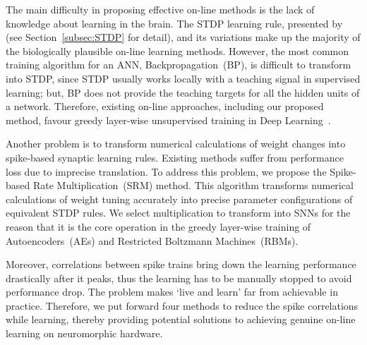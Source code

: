 
The main difficulty in proposing effective on-line methods is the lack of knowledge about learning in the brain.
The STDP learning rule, presented by~\citet{bi1998synaptic} (see Section~\ref{subsec:STDP} for detail), and its variations make up the majority of the biologically plausible on-line learning methods.
However, the most common training algorithm for an ANN, Backpropagation~(BP), is difficult to transform into STDP, since STDP usually works locally with a teaching signal in supervised learning; but, BP does not provide the teaching targets for all the hidden units of a network.
Therefore, existing on-line approaches, including our proposed method, favour greedy layer-wise unsupervised training in Deep Learning~\citep{hinton2006fast}.

Another problem is to transform numerical calculations of weight changes into spike-based synaptic learning rules.
Existing methods suffer from performance loss due to imprecise translation.
To address this problem, we propose the Spike-based Rate Multiplication~(SRM) method.
This algorithm transforms numerical calculations of weight tuning accurately into precise parameter configurations of equivalent STDP rules.
We select multiplication to transform into SNNs for the reason that it is the core operation in the greedy layer-wise training of Autoencoders~(AEs) and Restricted Boltzmann Machines~(RBMs).

Moreover, correlations between spike trains bring down the learning performance drastically after it peaks, thus the learning has to be manually stopped to avoid performance drop.
The problem makes `live and learn' far from achievable in practice.
Therefore, we put forward four methods to reduce the spike correlations while learning, thereby providing potential solutions to achieving genuine on-line learning on neuromorphic hardware.










